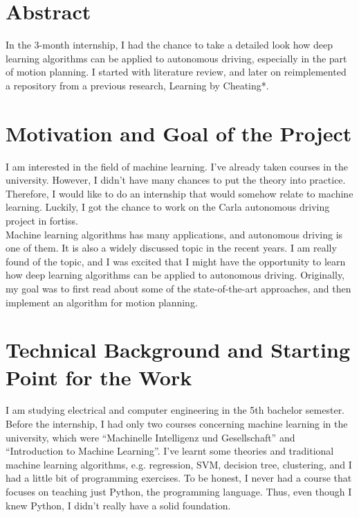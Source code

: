 \documentclass[inputenc=utf8]{ldvarticle}
\begin{document}
\pagebreak[4]

%
\section*{Abstract}
In the 3-month internship, I had the chance to take a detailed look how deep learning algorithms can be applied to autonomous driving, especially in the part of motion planning. I started with literature review, and later on reimplemented a repository from a previous research, Learning by Cheating*.


\section{Motivation and Goal of the Project}
I am interested in the field of machine learning. I’ve already taken courses in the university. However, I didn’t have many chances to put the theory into practice. Therefore, I would like to do an internship that would somehow relate to machine learning. Luckily, I got the chance to work on the Carla autonomous driving project in fortiss.
\\

\noindent Machine learning algorithms has many applications, and autonomous driving is one of them. It is also a widely discussed topic in the recent years. I am really found of the topic, and I was excited that I might have the opportunity to learn how deep learning algorithms can be applied to autonomous driving. Originally, my goal was to first read about some of the state-of-the-art approaches, and then implement an algorithm for motion planning.

\section{Technical Background and Starting Point for the Work}

I am studying electrical and computer engineering in the 5th bachelor semester. Before the internship, I had only two courses concerning machine learning in the university, which were “Machinelle Intelligenz und Gesellschaft” and “Introduction to Machine Learning”. I’ve learnt some theories and traditional machine learning algorithms, e.g. regression, SVM, decision tree, clustering, and I had a little bit of programming exercises. To be honest, I never had a course that focuses on teaching just Python, the programming language. Thus, even though I knew Python, I didn’t really have a solid foundation.
\\
\end{document}
